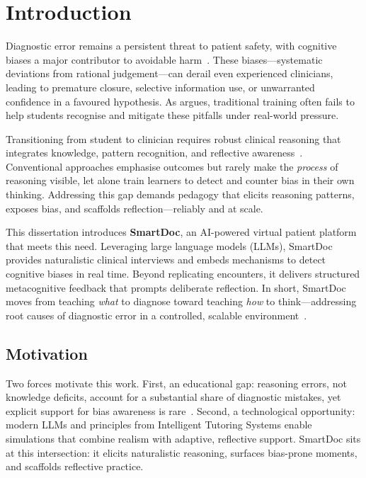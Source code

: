 \chapter{Introduction}
\label{chap:chap1}

Diagnostic error remains a persistent threat to patient safety, with cognitive biases a major contributor to avoidable harm~\parencite{graber_diagnostic_2005}. These biases—systematic deviations from rational judgement—can derail even experienced clinicians, leading to premature closure, selective information use, or unwarranted confidence in a favoured hypothesis. As \textcite{croskerry_importance_2003} argues, traditional training often fails to help students recognise and mitigate these pitfalls under real-world pressure.

Transitioning from student to clinician requires robust clinical reasoning that integrates knowledge, pattern recognition, and reflective awareness~\parencite{audetat_diagnosis_2017}. Conventional approaches emphasise outcomes but rarely make the \emph{process} of reasoning visible, let alone train learners to detect and counter bias in their own thinking. Addressing this gap demands pedagogy that elicits reasoning patterns, exposes bias, and scaffolds reflection—reliably and at scale.

This dissertation introduces \textbf{SmartDoc}, an AI-powered virtual patient platform that meets this need. Leveraging large language models (LLMs), SmartDoc provides naturalistic clinical interviews and embeds mechanisms to detect cognitive biases in real time. Beyond replicating encounters, it delivers structured metacognitive feedback that prompts deliberate reflection. In short, SmartDoc moves from teaching \emph{what} to diagnose toward teaching \emph{how} to think—addressing root causes of diagnostic error in a controlled, scalable environment~\parencite{mamede_structure_2004,berge_cognitive_2013}.

\section{Motivation}
\label{sec:se1}

Two forces motivate this work. First, an educational gap: reasoning errors, not knowledge deficits, account for a substantial share of diagnostic mistakes, yet explicit support for bias awareness is rare~\parencite{berge_cognitive_2013}. Second, a technological opportunity: modern LLMs and principles from Intelligent Tutoring Systems enable simulations that combine realism with adaptive, reflective support. SmartDoc sits at this intersection: it elicits naturalistic reasoning, surfaces bias-prone moments, and scaffolds reflective practice.

